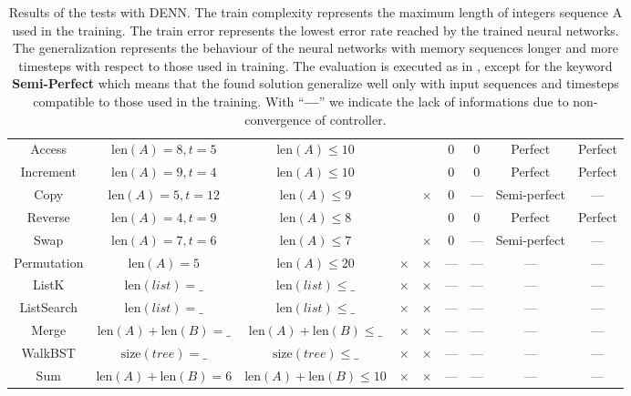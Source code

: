 \begin{table}[t]
{\begin{tabular}{ccccccccc}
		Access & $\textrm{len}(A) = 8, t = 5$ & $\textrm{len}(A) \leq 10$ & \checkmark & \checkmark & 0 & 0 & Perfect & Perfect \\ 
		Increment & 	$\textrm{len}(A) = 9, t = 4$ & $\textrm{len}(A) \leq 10$  & \checkmark & \checkmark & 0 & 0 & Perfect & Perfect \\
		Copy & $\textrm{len}(A) = 5, t = 12$ & $\textrm{len}(A) \leq 9$  & \checkmark & $\times$ & 0 & --- & Semi-perfect & --- \\ 
		Reverse & $\textrm{len}(A) = 4, t = 9$ & $\textrm{len}(A) \leq 8$ & \checkmark & \checkmark & 0 & 0 & Perfect & Perfect \\ 
		Swap & $\textrm{len}(A) = 7, t = 6$ & $\textrm{len}(A) \leq 7$ & \checkmark & $\times$ & 0 & --- & Semi-perfect & --- \\ \hline\hline
		Permutation & $\textrm{len}(A) = 5$ & $\textrm{len}(A) \leq 20$ & $\times$ & $\times$ & --- & --- & --- & --- \\ 
		ListK & $\textrm{len}(list) = \_$ & $\textrm{len}(list) \leq \_$ & $\times$ & $\times$ & --- & --- & --- & ---\\ 
		ListSearch & $\textrm{len}(list) = \_$ & $\textrm{len}(list) \leq \_$ & $\times$ & $\times$ & --- & --- & --- & ---  \\ 
		Merge & $\textrm{len}(A)+\textrm{len}(B) = \_$ & $\textrm{len}(A)+\textrm{len}(B) \leq \_$ & $\times$ & $\times$ & --- & --- & --- & --- \\ 
		WalkBST & $\textrm{size}(tree) = \_$ & $\textrm{size}(tree) \leq \_$ & $\times$ & $\times$ & --- & --- & --- & --- \\ 
		Sum & $\textrm{len}(A)+\textrm{len}(B) = 6$ & $\textrm{len}(A)+\textrm{len}(B) \leq 10$ & $\times$ & $\times$ & --- & --- & --- & --- \\
	\end{tabular}}
	\caption{Results of the tests with DENN. The train complexity represents the maximum length of integers sequence A used in the training. The train error represents the lowest error rate reached by the trained neural networks. The generalization represents the behaviour of the neural networks with memory sequences longer and more timesteps with respect to those used in training. The evaluation is executed as in \cite{NRAM:2016}, except for the keyword \textbf{Semi-Perfect} which means that the found solution generalize well only with input sequences and timesteps compatible to those used in the training. With ``\textbf{---}'' we indicate the lack of informations due to non-convergence of controller.}\label{tbl:denn-tests-results}
\end{table}
